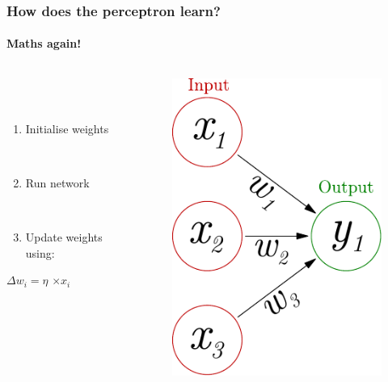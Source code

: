 \documentclass{beamer}
\newcommand{\figheight}{0.72\textheight}
\begin{document}
\begin{frame}
\frametitle{How does the perceptron learn?}
\framesubtitle{Maths again!}
  \begin{columns}[T]
    \begin{column}{.45\textwidth} 
        \  \\
 \   \\ 
\begin{enumerate}
 \item Initialise weights
 
 \ \\
 \item Run network
 
 \ \\
 
 \item Update weights using:

\end{enumerate}
 
 \begin{center}
 $ \Delta w_i = \eta$   $\times x_{i}$
 \end{center} 
  \ \\
 

    \end{column}
    \begin{column}{.55\textwidth}
\begin{figure}[t]
\centering
\includegraphics[height = \figheight]{./fig/perceptron_maths.pdf}
\end{figure}
    \end{column}
  \end{columns}
\end{frame}
\end{document}
